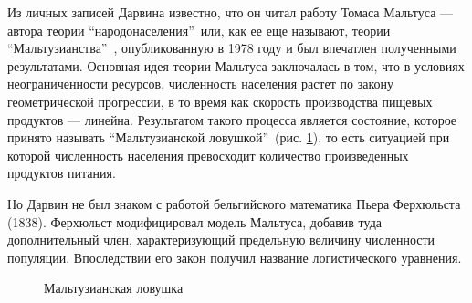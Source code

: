 Из личных записей Дарвина известно, что он читал работу Томаса Мальтуса --- автора теории ``народонаселения''\, или, как ее еще называют, теории ``Мальтузианства''\, \cite{Malthus}, опубликованную в 1978 году и был впечатлен полученными результатами. Основная идея теории Мальтуса заключалась в том, что в условиях неограниченности ресурсов, численность населения растет по закону геометрической прогрессии, в то время как скорость производства пищевых продуктов --- линейна. Результатом такого процесса является состояние, которое принято называть ``Мальтузианской ловушкой''\, (рис. \ref{fig2}), то есть ситуацией при которой численность населения превосходит количество произведенных продуктов питания. 

Но Дарвин не был знаком с работой бельгийского математика Пьера Ферхюльста \cite{Verhlust} (1838). Ферхюльст модифицировал модель Мальтуса, добавив туда дополнительный член, характеризующий предельную величину численности популяции. Впоследствии его закон получил название логистического уравнения.

\begin{figure}[ht]
\caption{Мальтузианская ловушка}
\label{fig2}
\end{figure}